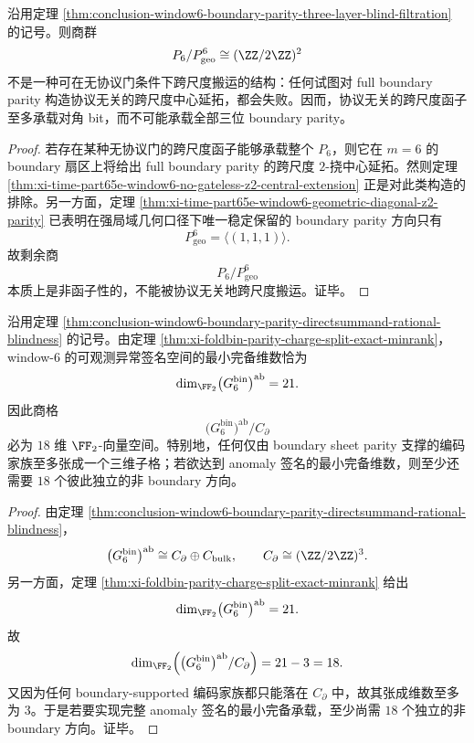 \begin{corollary}\label{cor:conclusion-window6-boundary-parity-residual-two-bits-nonfunctorial}
沿用定理 \ref{thm:conclusion-window6-boundary-parity-three-layer-blind-filtration} 的记号。则商群
\[
P_6/P_{\mathrm{geo}}^6\cong (\ZZ/2\ZZ)^2
\]
不是一种可在无协议门条件下跨尺度搬运的结构：任何试图对 full boundary parity 构造协议无关的跨尺度中心延拓，都会失败。因而，协议无关的跨尺度函子至多承载对角 bit，而不可能承载全部三位 boundary parity。
\end{corollary}
\begin{proof}
若存在某种无协议门的跨尺度函子能够承载整个 \(P_6\)，则它在 \(m=6\) 的 boundary 扇区上将给出 full boundary parity 的跨尺度 \(2\)-挠中心延拓。然则定理 \ref{thm:xi-time-part65e-window6-no-gateless-z2-central-extension} 正是对此类构造的排除。另一方面，定理 \ref{thm:xi-time-part65e-window6-geometric-diagonal-z2-parity} 已表明在强局域几何口径下唯一稳定保留的 boundary parity 方向只有
\[
P_{\mathrm{geo}}^6=\langle(1,1,1)\rangle.
\]
故剩余商
\[
P_6/P_{\mathrm{geo}}^6
\]
本质上是非函子性的，不能被协议无关地跨尺度搬运。证毕。
\end{proof}

\begin{corollary}\label{cor:conclusion-window6-boundary-parity-misses-eighteen-anomaly-directions}
沿用定理 \ref{thm:conclusion-window6-boundary-parity-directsummand-rational-blindness} 的记号。由定理 \ref{thm:xi-foldbin-parity-charge-split-exact-minrank}，window-\(6\) 的可观测异常签名空间的最小完备维数恰为
\[
\dim_{\FF_2}\bigl(G_6^{\mathrm{bin}}\bigr)^{\mathrm{ab}}=21.
\]
因此商格
\[
\bigl(G_6^{\mathrm{bin}}\bigr)^{\mathrm{ab}}/C_{\partial}
\]
必为 \(18\) 维 \(\FF_2\)-向量空间。特别地，任何仅由 boundary sheet parity 支撑的编码家族至多张成一个三维子格；若欲达到 anomaly 签名的最小完备维数，则至少还需要 \(18\) 个彼此独立的非 boundary 方向。
\end{corollary}
\begin{proof}
由定理 \ref{thm:conclusion-window6-boundary-parity-directsummand-rational-blindness}，
\[
\bigl(G_6^{\mathrm{bin}}\bigr)^{\mathrm{ab}}
\cong
C_{\partial}\oplus C_{\mathrm{bulk}},
\qquad
C_{\partial}\cong (\ZZ/2\ZZ)^3.
\]
另一方面，定理 \ref{thm:xi-foldbin-parity-charge-split-exact-minrank} 给出
\[
\dim_{\FF_2}\bigl(G_6^{\mathrm{bin}}\bigr)^{\mathrm{ab}}=21.
\]
故
\[
\dim_{\FF_2}\Bigl(\bigl(G_6^{\mathrm{bin}}\bigr)^{\mathrm{ab}}/C_{\partial}\Bigr)=21-3=18.
\]
又因为任何 boundary-supported 编码家族都只能落在 \(C_{\partial}\) 中，故其张成维数至多为 \(3\)。于是若要实现完整 anomaly 签名的最小完备承载，至少尚需 \(18\) 个独立的非 boundary 方向。证毕。
\end{proof}

